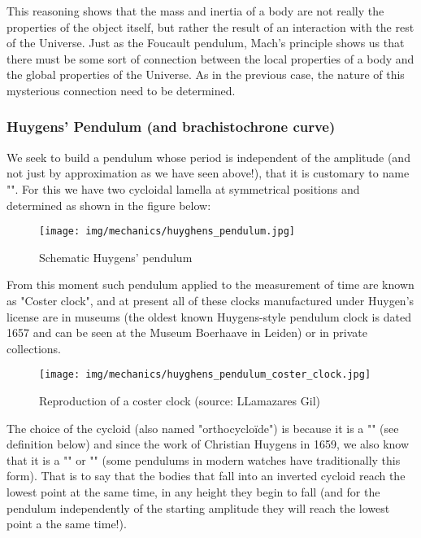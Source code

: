 	This reasoning shows that the mass and inertia of a body are not really the properties of the object itself, but rather the result of an interaction with the rest of the Universe. Just as the Foucault pendulum, Mach's principle shows us that there must be some sort of connection between the local properties of a body and the global properties of the Universe. As in the previous case, the nature of this mysterious connection need to be determined.
	
	\pagebreak
	\subsubsection{Huygens' Pendulum (and brachistochrone curve)}
	We seek to build a pendulum whose period is independent of the amplitude (and not just by approximation as we have seen above!), that it is customary to name "". For this we have two cycloidal lamella at symmetrical positions and determined as shown in the figure below:
	\begin{figure}[H]
		\centering
		\texttt{[image: img/mechanics/huyghens\_pendulum.jpg]}
		\caption{Schematic Huygens' pendulum}
	\end{figure}
	From this moment such pendulum applied to the measurement of time are known as "Coster clock",  and at present all of these clocks manufactured under Huygen's license are in museums (the oldest known Huygens-style pendulum clock is dated 1657 and can be seen at the Museum Boerhaave in Leiden) or in private collections.
	\begin{figure}[H]
		\centering
		\texttt{[image: img/mechanics/huyghens\_pendulum\_coster\_clock.jpg]}
		\caption{Reproduction of a coster clock (source: LLamazares Gil)}
	\end{figure}
	The choice of the cycloid (also named "orthocycloïde") is because it is a "" (see definition below) and since the work of Christian Huygens in 1659, we also know that it is a "" or "" (some pendulums in modern watches have traditionally this form). That is to say that the bodies that fall into an inverted cycloid reach the lowest point at the same time, in any height they begin to fall (and for the pendulum independently of the starting amplitude they will reach the lowest point a the same time!).

